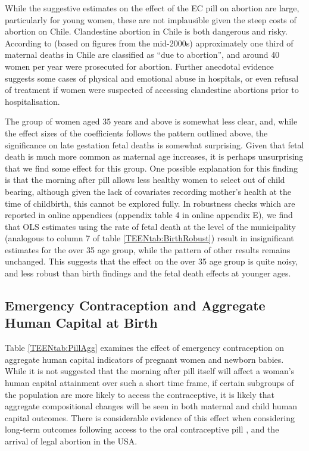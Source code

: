 While the suggestive estimates on the effect of the EC pill on abortion are 
large, particularly for young women, these are not implausible given the steep 
costs of abortion on Chile.  Clandestine abortion in Chile is both dangerous and
risky.  According to \citet{ShepardCasas2007} (based on figures from the 
mid-2000s) approximately one third of maternal deaths in Chile are classified as 
``due to abortion'', and around 40 women per year were prosecuted for abortion.
Further anecdotal evidence suggests some cases of physical and emotional abuse 
in hospitals, or even refusal of treatment if women were suspected of accessing 
clandestine abortions prior to hospitalisation.

The group of women aged 35 years and above is somewhat less clear, and, while the 
effect sizes of the coefficients follows the pattern outlined above, the
significance on late gestation fetal deaths is somewhat surprising.  Given that
fetal death is much more common as maternal age increases, it is perhaps 
unsurprising that we find some effect for this group.  One possible explanation
for this finding is that the morning after pill allows less healthy women to 
select out of child bearing, although given the lack of covariates recording 
mother's health at the time of childbirth, this cannot be explored fully.  In
robustness checks which are reported in online appendices (appendix table 4 in
online appendix E), we find that OLS estimates using the rate of fetal death at 
the level of the municipality (analogous to column 7 of table 
\ref{TEENtab:BirthRobust}) result in insignificant estimates for the over 35 age 
group, while the pattern of other results remains unchanged. This suggests that 
the effect on the over 35 age group is quite noisy, and less robust than birth 
findings and the fetal death effects at younger ages.

\subsection{Emergency Contraception and Aggregate Human Capital at Birth}
Table \ref{TEENtab:PillAgg} examines the effect of emergency contraception on
aggregate human capital indicators of pregnant women and newborn babies.  While
it is not suggested that the morning after pill itself will affect a woman's
human capital attainment over such a short time frame, if certain subgroups of 
the population are more likely to access the contraceptive, it is likely that 
aggregate compositional changes will be seen in both maternal and child human 
capital outcomes.  There is considerable evidence of this effect when considering
long-term outcomes following access to the oral contraceptive pill 
\citep{Baileyetal2012,OltmansHungerman2012}, and the arrival of legal abortion 
\citep{Whitaker2011,Ananatetal2009} in the USA.

